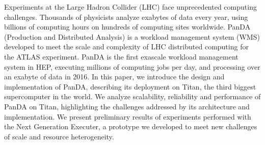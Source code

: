 
Experiments at the Large Hadron Collider (LHC) face unprecedented computing
challenges. Thousands of physicists analyze exabytes of data every year, using
billions of computing hours on hundreds of computing sites worldwide. PanDA
(Production and Distributed Analysis) is a workload management system (WMS)
developed to meet the scale and complexity of LHC distributed computing for the
ATLAS experiment. PanDA is the first exascale workload management system in HEP,
executing millions of computing jobs per day, and processing over an exabyte of
data in 2016. In this paper, we introduce the design and implementation of
PanDA, describing its deployment on Titan, the third biggest supercomputer in
the world. We analyze scalability, reliability and performance of PanDA on
Titan, highlighting the challenges addressed by its architecture and
implementation. We present preliminary results of experiments performed with the
Next Generation Executer, a prototype we developed to meet new challenges of
scale and resource heterogeneity.

